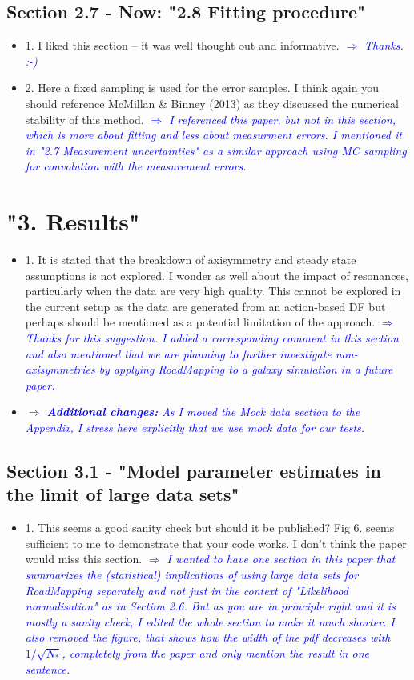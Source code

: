 \documentclass[10pt,a4paper]{article}
\newcommand{\Comment}[1]{\textsl{\textcolor{Blue}{$\Longrightarrow$ {#1}}}}
\newcommand{\RM}{{\sl RoadMapping}}
\begin{document}
\subsection{Section 2.7 - Now: "2.8 Fitting procedure"}
\begin{itemize}
\item 1. I liked this section -- it was well thought out and informative. \Comment{Thanks. :-)}
\item 2. Here a fixed sampling is used for the error samples. I think again you should reference McMillan \& Binney (2013) as they discussed the numerical stability of this method. \Comment{I referenced this paper, but not in this section, which is more about fitting and less about measurment errors. I mentioned it in "2.7 Measurement uncertainties" as a similar approach using MC sampling for convolution with the measurement errors.}
\end{itemize}

\section{"3. Results"}
\begin{itemize}
\item 1. It is stated that the breakdown of axisymmetry and steady state assumptions is not explored. I wonder as well about the impact of resonances, particularly when the data are very high quality. This cannot be explored in the current setup as the data are generated from an action-based DF but perhaps should be mentioned as a potential limitation of the approach. \Comment{Thanks for this suggestion. I added a corresponding comment in this section and also mentioned that we are planning to further investigate non-axisymmetries by applying \RM{} to a galaxy simulation in a future paper.}
\item \Comment{\textbf{Additional changes:} As I moved the Mock data section to the Appendix, I stress here explicitly that we use mock data for our tests.}
\end{itemize}


\subsection{Section 3.1 - "Model parameter estimates in the limit of large data sets"}
\begin{itemize}
\item 1. This seems a good sanity check but should it be published? Fig 6. seems sufficient to me to demonstrate that your code works. I don't think the paper would miss this section. \Comment{I wanted to have one section in this paper that summarizes the (statistical) implications of using large data sets for \RM{} separately and not just in the context of "Likelihood normalisation" as in Section 2.6. But as you are in principle right and it is mostly a sanity check, I edited the whole section to make it much shorter. I also removed the figure, that shows how the width of the pdf decreases with $1/\sqrt{N_*}$, completely from the paper and only mention the result in one sentence.}
\end{itemize}
\end{document}
